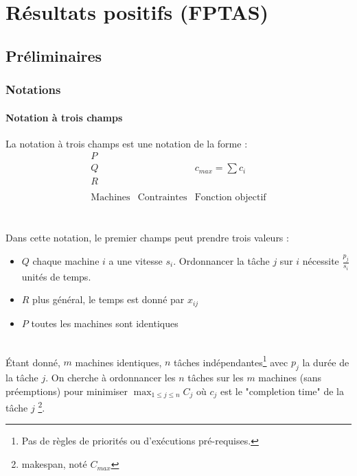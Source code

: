 \documentclass[a4paper, 11pt]{thesis}
\begin{document}
\chapter{R\'{e}sultats positifs (FPTAS)}

\section{Préliminaires}

\subsection{Notations}

\subsubsection{Notation à trois champs}

La notation à trois champs est une notation de la forme :
\begin{displaymath}
    \begin{array}{c|c|c}
        P & & \\
        Q & & c_{max} = \sum c_i \\
        R & & \\
          & & \\
        \mbox{Machines} & \mbox{Contraintes} & \mbox{Fonction objectif} \\
    \end{array}
\end{displaymath}

\begin{rmq}
    ~\\Dans cette notation, le premier champs peut prendre trois valeurs :
\begin{itemize}
    \item $Q$ chaque machine $i$ a une vitesse $s_i$. Ordonnancer la tâche $j$ sur $i$ nécessite
        $\frac{p_j}{s_i}$ unités de temps.
    \item $R$ plus général, le temps est donné par $x_{ij}$
    \item $P$ toutes les machines sont identiques\\
\end{itemize}
\end{rmq}

\begin{ex}[$P | C | C_{MAX}$]

~\\Étant donné, $m$ machines identiques, $n$ tâches indépendantes\footnote{Pas de règles de
priorités ou d'exécutions pré-requises.} avec $p_j$ la durée de la tâche $j$.
On cherche à ordonnancer les $n$ tâches sur les $m$ machines (sans préemptions) pour minimiser
$\max_{1 \leq j \leq n} C_j$ où $c_j$ est le "completion time" de la tâche $j$ \footnote{makespan,
noté $C_{max}$}.\\
\end{ex}
\end{document}
